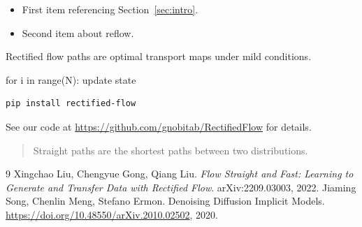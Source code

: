 \documentclass{article}
\begin{document}
\begin{itemize}
\item First item referencing Section~\ref{sec:intro}.
\item Second item about reflow.
\end{itemize}

\begin{theorem}
\label{thm:main}
Rectified flow paths are optimal transport maps under mild conditions.
\end{theorem}

\begin{algorithm}
\caption{Rectified Flow Sampling}
\label{alg:sampling}
\begin{algorithmic}
\STATE for i in range(N): update state
\ENDFOR
\end{algorithmic}
\end{algorithm}

\begin{verbatim}
pip install rectified-flow
\end{verbatim}

See our code at \url{https://github.com/gnobitab/RectifiedFlow} for details.

\begin{quote}
Straight paths are the shortest paths between two distributions.
\end{quote}

\appendix


\begin{thebibliography}{9}
 Xingchao Liu, Chengyue Gong, Qiang Liu. \emph{Flow Straight and Fast:
Learning to Generate and Transfer Data with Rectified Flow}. arXiv:2209.03003, 2022.
 Jiaming Song, Chenlin Meng, Stefano Ermon. Denoising Diffusion
Implicit Models. \url{https://doi.org/10.48550/arXiv.2010.02502}, 2020.
\end{thebibliography}
\end{document}
